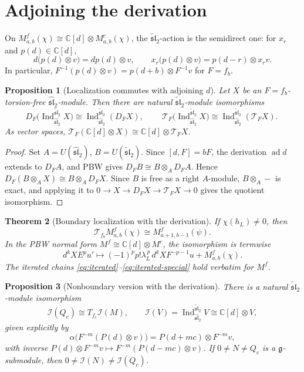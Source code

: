 \documentclass[11pt,a4paper]{article}
\newcommand{\C}{\mathbb C}
\newcommand{\g}{\mathfrak g}
\newcommand{\slh}{\widehat{\mathfrak{sl}}_2}
\newcommand{\slt}{\widetilde{\mathfrak{sl}}_2}
\newcommand{\ad}{\operatorname{ad}}
\newcommand{\Ind}{\operatorname{Ind}}
\newcommand{\I}{\mathcal I}
\newcommand{\T}{\mathcal T}
\theoremstyle{plainupright}
\newtheorem{proposition}{Proposition}[section]
\newtheorem{theorem}[proposition]{Theorem}
\begin{document}
\section{Adjoining the derivation}\label{sec:derivation}

On \(M^f_{a,b}(\chi)\cong\C[d]\otimes M^c_{a,b}(\chi)\), the \(\slt\)-action is
the semidirect one: for \(x_r\) and \(p(d)\in\C[d]\),
\[
d\bigl(p(d)\otimes v\bigr)=dp(d)\otimes v,\qquad
x_r\bigl(p(d)\otimes v\bigr)=p(d-r)\otimes x_rv.
\]
In particular, \(F^{-1}(p(d)\otimes v)=p(d+b)\otimes F^{-1}v\) for \(F=f_b\).

\begin{proposition}[Localization commutes with adjoining \(d\)]
\label{prop:loc-induction}
Let \(X\) be an \(F=f_b\)-torsion-free \(\slh\)-module. Then there are natural
\(\slt\)-module isomorphisms
\[
D_F\bigl(\Ind_{\slh}^{\slt}X\bigr)\cong\Ind_{\slh}^{\slt}(D_FX),
\qquad
\boxed{\ \T_F\bigl(\Ind_{\slh}^{\slt}X\bigr)\cong\Ind_{\slh}^{\slt}(\T_FX).\ }
\]
As vector spaces, \(\T_F(\C[d]\otimes X)\cong\C[d]\otimes\T_FX\).
\end{proposition}

\begin{proof}
Set \(A=U(\slh)\), \(B=U(\slt)\). Since \([d,F]=bF\), the derivation \(\ad d\)
extends to \(D_FA\), and PBW gives \(D_FB\cong B\otimes_AD_FA\). Hence
\(D_F(B\otimes_AX)\cong B\otimes_AD_FX\). Since \(B\) is free as a right
\(A\)-module, \(B\otimes_A-\) is exact, and applying it to
\(0\to X\to D_FX\to\T_FX\to0\) gives the quotient isomorphism.
\end{proof}

\begin{theorem}[Boundary localization with the derivation]\label{thm:boundary-f}
If \(\chi(h_L)\ne0\), then
\[
\boxed{\ \T_{f_b}M^f_{a,b}(\chi)\cong M^f_{a+1,b-1}(\psi).\ }
\]
In the PBW normal form \(M^f\cong\C[d]\otimes M^c\), the isomorphism is
termwise
\[
d^kXE^pu'\longmapsto
(-1)^pp!\lambda_L^{\,p}\,d^kXF^{-p-1}u+M^f_{a,b}(\chi).
\]
The iterated chains \eqref{eq:iterated}--\eqref{eq:iterated-special} hold
verbatim for \(M^f\).
\end{theorem}

\begin{proposition}[Nonboundary version with the derivation]\label{prop:d-nonb}
There is a natural \(\slt\)-module isomorphism
\[
\I(Q_c)\cong T_{f_c}\I(M),\qquad
\I(V)=\Ind_{\slh}^{\slt}V\cong\C[d]\otimes V,
\]
given explicitly by
\[
\alpha\bigl(F^{-m}(P(d)\otimes v)\bigr)=P(d+mc)\otimes F^{-m}v,
\]
with inverse \(P(d)\otimes F^{-m}v\mapsto F^{-m}(P(d-mc)\otimes v)\). If
\(0\ne N\ne Q_c\) is a \(\g\)-submodule, then
\(0\ne\I(N)\ne\I(Q_c)\).
\end{proposition}
\end{document}
